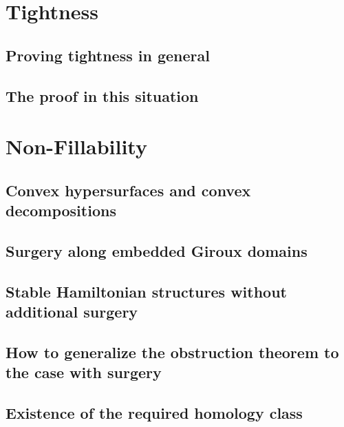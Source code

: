 \documentclass[oneside]{amsbook}
\begin{document}
\chapter{Tightness}

\section{Proving tightness in general}

\section{The proof in this situation}


\chapter{Non-Fillability}
\section{Convex hypersurfaces and convex decompositions}

\section{Surgery along embedded Giroux domains}

\section{Stable Hamiltonian structures without additional surgery}
\section{How to generalize the obstruction theorem to the case with surgery}
\section{Existence of the required homology class}


\newpage


\end{document}
